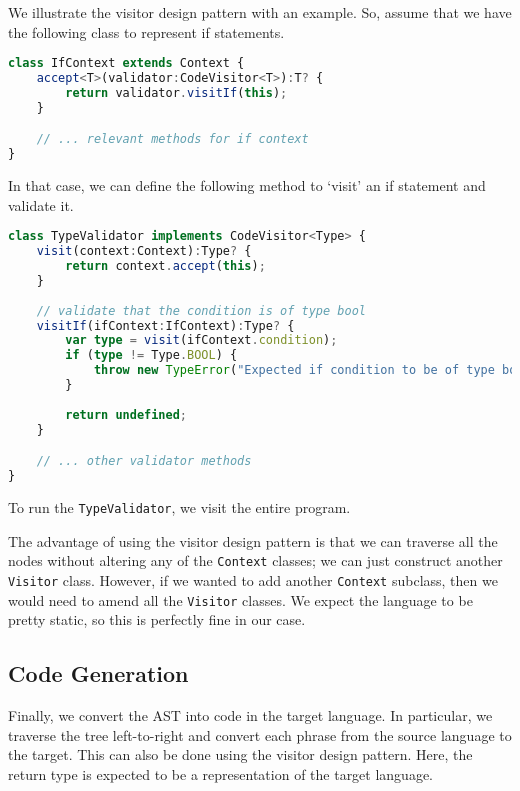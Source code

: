We illustrate the visitor design pattern with an example. So, assume that we have the following class to represent if statements.
\begin{lstlisting}[language=TypeScript]
class IfContext extends Context {    
    accept<T>(validator:CodeVisitor<T>):T? {
        return validator.visitIf(this);
    }

    // ... relevant methods for if context
}
\end{lstlisting}
    In that case, we can define the following method to `visit' an if statement and validate it.
\begin{lstlisting}[language=TypeScript]
class TypeValidator implements CodeVisitor<Type> {
    visit(context:Context):Type? {
        return context.accept(this);
    }
    
    // validate that the condition is of type bool 
    visitIf(ifContext:IfContext):Type? {
        var type = visit(ifContext.condition);
        if (type != Type.BOOL) {
            throw new TypeError("Expected if condition to be of type bool.");
        }
        
        return undefined;
    }

    // ... other validator methods
}
\end{lstlisting}
To run the \texttt{TypeValidator}, we visit the entire program.

The advantage of using the visitor design pattern is that we can traverse all the nodes without altering any of the \texttt{Context} classes; we can just construct another \texttt{Visitor} class. However, if we wanted to add another \texttt{Context} subclass, then we would need to amend all the \texttt{Visitor} classes. We expect the language to be pretty static, so this is perfectly fine in our case.

\subsection{Code Generation}
Finally, we convert the AST into code in the target language. In particular, we traverse the tree left-to-right and convert each phrase from the source language to the target. This can also be done using the visitor design pattern. Here, the return type is expected to be a representation of the target language.
